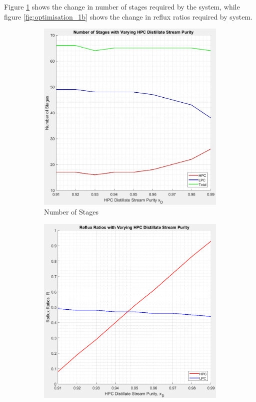     \noindent Figure \ref{fig:optimisation_1a} shows the change in number of stages required by the system, while figure \ref{fig:optimisation_1b} shows the change in reflux ratios required by system. \\
    \begin{figure}[ht]
        \centering
        \begin{subfigure}{0.49\textwidth}
            \includegraphics[width=\linewidth]{graph-stages_vs_HPCxD.jpg}
            \caption{Number of Stages} \label{fig:optimisation_1a}
        \end{subfigure}
        \hspace*{\fill} %
        \begin{subfigure}{0.49\textwidth}
            \includegraphics[width=\linewidth]{graph-reflux_vs_HPCxD.jpeg}

\end{subfigure}
\end{figure}
